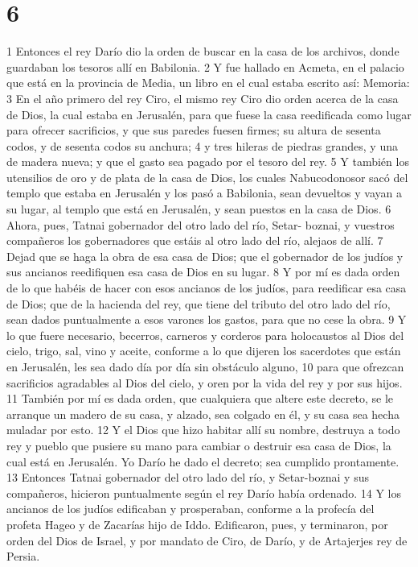 \chapter{6}


1 Entonces el rey Darío dio la orden de buscar en la casa de los archivos, donde guardaban los tesoros allí en Babilonia.
2 Y fue hallado en Acmeta, en el palacio que está en la provincia de Media, un libro en el cual estaba escrito así: Memoria:
3 En el año primero del rey Ciro, el mismo rey Ciro dio orden acerca de la casa de Dios, la cual estaba en Jerusalén, para que fuese la casa reedificada como lugar para ofrecer sacrificios, y que sus paredes fuesen firmes; su altura de sesenta codos,  y de sesenta codos su anchura;
4 y tres hileras de piedras grandes, y una de madera nueva; y que el gasto sea pagado por el tesoro del rey.
5 Y también los utensilios de oro y de plata de la casa de Dios, los cuales Nabucodonosor sacó del templo que estaba en Jerusalén y los pasó a Babilonia, sean devueltos y vayan a su lugar, al templo que está en Jerusalén, y sean puestos en la casa de Dios.
6 Ahora, pues, Tatnai gobernador del otro lado del río, Setar- boznai, y vuestros compañeros los gobernadores que estáis al otro lado del río, alejaos de allí.
7 Dejad que se haga la obra de esa casa de Dios; que el gobernador de los judíos y sus ancianos reedifiquen esa casa de Dios en su lugar.
8 Y por mí es dada orden de lo que habéis de hacer con esos ancianos de los judíos, para reedificar esa casa de Dios; que de la hacienda del rey, que tiene del tributo del otro lado del río, sean dados puntualmente a esos varones los gastos, para que no cese la obra.
9 Y lo que fuere necesario, becerros, carneros y corderos para holocaustos al Dios del cielo, trigo, sal, vino y aceite, conforme a lo que dijeren los sacerdotes que están en Jerusalén, les sea dado día por día sin obstáculo alguno,
10 para que ofrezcan sacrificios agradables al Dios del cielo, y oren por la vida del rey y por sus hijos.
11 También por mí es dada orden, que cualquiera que altere este decreto, se le arranque un madero de su casa, y alzado, sea colgado en él, y su casa sea hecha muladar por esto.
12 Y el Dios que hizo habitar allí su nombre, destruya a todo rey y pueblo que pusiere su mano para cambiar o destruir esa casa de Dios, la cual está en Jerusalén. Yo Darío he dado el decreto; sea cumplido prontamente.
13 Entonces Tatnai gobernador del otro lado del río, y Setar-boznai y sus compañeros, hicieron puntualmente según el rey Darío había ordenado.
14 Y los ancianos de los judíos edificaban y prosperaban, conforme a la profecía del profeta Hageo y de Zacarías hijo de Iddo. Edificaron, pues, y terminaron, por orden del Dios de Israel, y por mandato de Ciro, de Darío, y de Artajerjes rey de Persia.
